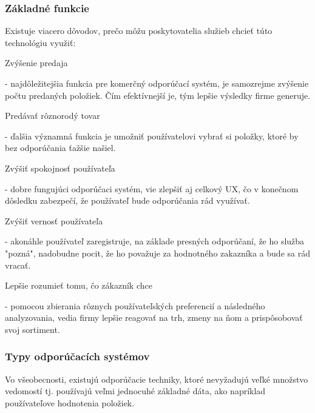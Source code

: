 \subsubsection{Základné funkcie}
Existuje viacero dôvodov, prečo môžu poskytovatelia služieb chcieť túto technológiu využiť: 
 \begin{itemize}[leftmargin=*]
{\bf \item Zvýšenie predaja} - najdôležitejšia funkcia pre komerčný odporúčací systém, je samozrejme zvýšenie počtu predaných položiek. Čím efektívnejší je, tým lepšie výsledky firme generuje.

{\bf \item Predávať rôznorodý tovar} - ďalšia významná funkcia je umožniť používatelovi vybrať si položky, ktoré by bez odporúčania ťažšie našiel.
 
	{\bf \item Zvýšiť spokojnosť používateľa} - dobre fungujúci odporúčaci systém, vie zlepšiť aj celkový UX, čo v konečnom dôsledku zabezpečí, že používateľ bude odporúčania rád využívať.

	{\bf \item Zvýšiť vernosť používateľa} - akonáhle používateľ zaregistruje, na základe presných odporúčaní, že ho služba "pozná", nadobudne pocit, že ho považuje za hodnotného zakazníka a bude sa rád vracať.
	
	{\bf \item Lepšie rozumieť tomu, čo zákazník chce} - pomocou zbierania rôznych používateľských preferencií a následného analyzovania, vedia firmy lepšie reagovať na trh, zmeny na ňom a prispôsobovať svoj sortiment.  \newline

\end{itemize} 


\subsubsection{Typy odporúčacích systémov}
Vo všeobecnosti, existujú odporúčacie techniky, ktoré nevyžadujú veľké množstvo vedomostí tj. používajú veľmi jednocuhé základné dáta, ako napríklad používateľove hodnotenia položiek.

